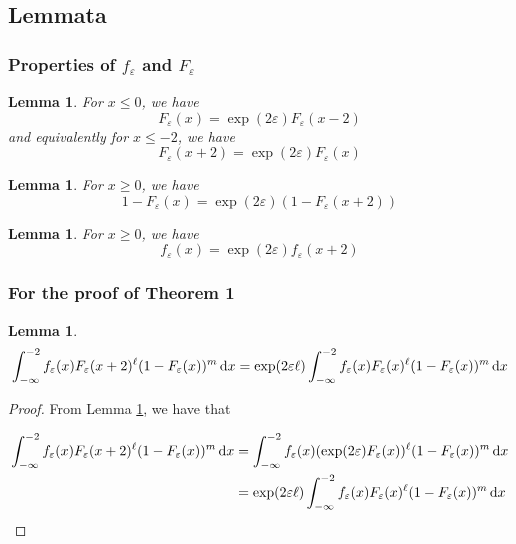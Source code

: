 \documentclass{article}
\newtheorem{lemma}[theorem]{Lemma}
\renewcommand{\epsilon}{\varepsilon}
\newcommand{\1}{\langle 1 \rangle}
\newcommand{\2}{\langle 2 \rangle}
\begin{document}
\subsection{Lemmata}

\subsubsection{Properties of $f_\epsilon$ and $F_\epsilon$}

\begin{lemma} 
    \label{lemma:F_equality_neg}
    For $x \leq 0$, we have 
    \[F_\epsilon(x) = \exp(2\epsilon)F_\epsilon(x - 2)\]
    and equivalently for $x \leq -2$, we have 
    \[F_\epsilon(x + 2) = \exp(2\epsilon)F_\epsilon(x)\]
\end{lemma}

\begin{lemma}
    \label{lemma:F_equality_pos}
    For $x \geq 0$, we have \[1 - F_{\epsilon}(x) = \exp(2\epsilon) (1 - F_\epsilon(x + 2))\]
\end{lemma}

\begin{lemma}
    \label{lemma:f_equality}
    For $x \geq 0$, we have
    \[f_\epsilon(x) = \exp(2\epsilon) f_\epsilon(x + 2) \]
\end{lemma}

\subsubsection{For the proof of Theorem 1}
\begin{lemma} 
    \label{lemma:sl_tight_minus_infty} 
    \[\int_{-\infty}^{-2} f_{\epsilon}(x) F_{\epsilon}(x + 2)^\ell (1 - F_{\epsilon}(x))^m \dif x = \exp(2 \epsilon \ell) \int_{-\infty}^{-2} f_{\epsilon}(x) F_{\epsilon}(x)^\ell (1 - F_{\epsilon}(x))^m \dif x\]
\end{lemma}

\begin{proof}
    From Lemma \ref{lemma:F_equality_neg}, we have that 

    \begin{align*}
        \int_{-\infty}^{-2} f_{\epsilon}(x) F_{\epsilon}(x + 2)^\ell (1 - F_{\epsilon}(x))^m \dif x &= \int_{-\infty}^{-2} f_{\epsilon}(x) (\exp(2\epsilon) F_{\epsilon}(x))^\ell (1 - F_{\epsilon}(x))^m \dif x \\
        &= \exp(2\epsilon \ell) \int_{-\infty}^{-2} f_{\epsilon}(x) F_{\epsilon}(x)^\ell (1 - F_{\epsilon}(x))^m \dif x
    \end{align*}
\end{proof}
\end{document}
